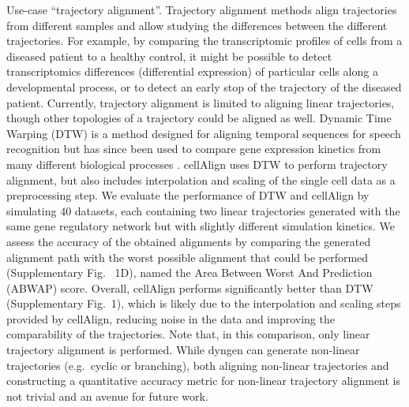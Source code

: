 \documentclass[10pt, a4paper]{article}
\begin{document}
Use-case ``trajectory alignment''. Trajectory alignment methods align
trajectories from different samples and allow studying the differences
between the different trajectories. For example, by comparing the
transcriptomic profiles of cells from a diseased patient to a healthy
control, it might be possible to detect transcriptomics differences
(differential expression) of particular cells along a developmental
process, or to detect an early stop of the trajectory of the diseased
patient. Currently, trajectory alignment is limited to aligning linear
trajectories, though other topologies of a trajectory could be aligned
as well. Dynamic Time Warping (DTW)
\cite{giorgino_computingvisualizingdynamic_2009} is a method
designed for aligning temporal sequences for speech recognition but has
since been used to compare gene expression kinetics from many different
biological processes
\cite{cacchiarelli_aligningsinglecelldevelopmental_2018,kanton_organoidsinglecellgenomic_2019,mcfaline-figueroa_pooledsinglecellgenetic_2019,alpert_alignmentsinglecelltrajectories_2018}.
cellAlign \cite{alpert_alignmentsinglecelltrajectories_2018} uses
DTW to perform trajectory alignment, but also includes interpolation and
scaling of the single cell data as a preprocessing step. We evaluate the
performance of DTW and cellAlign by simulating 40 datasets, each
containing two linear trajectories generated with the same gene
regulatory network but with slightly different simulation kinetics. We
assess the accuracy of the obtained alignments by comparing the
generated alignment path with the worst possible alignment that could be
performed (Supplementary Fig. ~1D), named the Area Between Worst And
Prediction (ABWAP) score. Overall, cellAlign performs significantly
better than DTW (Supplementary Fig.~1), which is likely due to the
interpolation and scaling steps provided by cellAlign, reducing noise in
the data and improving the comparability of the trajectories. Note that,
in this comparison, only linear trajectory alignment is performed. While
dyngen can generate non-linear trajectories (e.g.~cyclic or branching),
both aligning non-linear trajectories and constructing a quantitative
accuracy metric for non-linear trajectory alignment is not trivial and
an avenue for future work.
\end{document}

